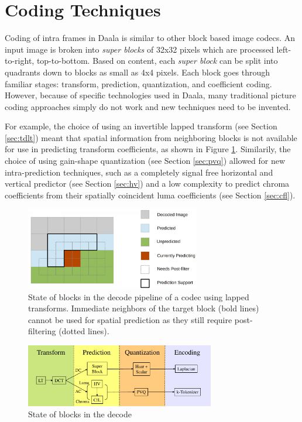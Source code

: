 \documentclass[conference, 10pt]{IEEEtran}
\begin{document}
\section{Coding Techniques}

Coding of intra frames in Daala is similar to other block based image codecs.
An input image is broken into {\em super blocks} of 32x32 pixels which are
 processed left-to-right, top-to-bottom.
Based on content, each {\em super block} can be split into quadrants down
 to blocks as small as 4x4 pixels.
Each block goes through familiar stages: transform, prediction, quantization,
 and coefficient coding.
However, because of specific technologies used in Daala, many traditional
 picture coding approaches simply do not work and new techniques need to
 be invented.

For example, the choice of using an invertible lapped transform (see Section
 \ref{sec:tdlt}) meant that spatial information from neighboring blocks is not
 available for use in predicting transform coefficients, as shown in Figure
 \ref{fig:decode}.
Similarily, the choice of using gain-shape quantization (see Section \ref{sec:pvq})
 allowed for new intra-prediction techniques, such as a completely signal free
 horizontal and vertical predictor (see Section \ref{sec:hv}) and a low
 complexity to predict chroma coefficients from their spatially coincident
 luma coefficients (see Section \ref{sec:cfl}).

\begin{figure}[h]
\begin{center}
\noindent
  \includegraphics[natwidth=1376,natheight=646,width=3in]{daala_decode.png}
  \caption[example]{\label{fig:decode} State of blocks in the decode pipeline of
   a codec using lapped transforms. Immediate neighbors of the target block
   (bold lines) cannot be used for spatial prediction as they still require
   post-filtering (dotted lines).}
\end{center}
\end{figure}

\begin{figure}[h]
\begin{center}
\noindent
  \includegraphics[natwidth=9in,natheight=3in,width=3.25in]{daala_pipeline.pdf}
  \caption[example]{\label{fig:pipeline} State of blocks in the decode}
\end{center}
\end{figure}
\end{document}
